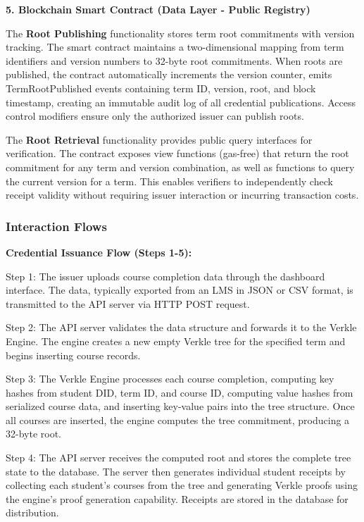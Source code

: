 \textbf{5. Blockchain Smart Contract (Data Layer - Public Registry)}

The \textbf{Root Publishing} functionality stores term root commitments with version tracking. The smart contract maintains a two-dimensional mapping from term identifiers and version numbers to 32-byte root commitments. When roots are published, the contract automatically increments the version counter, emits TermRootPublished events containing term ID, version, root, and block timestamp, creating an immutable audit log of all credential publications. Access control modifiers ensure only the authorized issuer can publish roots.

The \textbf{Root Retrieval} functionality provides public query interfaces for verification. The contract exposes view functions (gas-free) that return the root commitment for any term and version combination, as well as functions to query the current version for a term. This enables verifiers to independently check receipt validity without requiring issuer interaction or incurring transaction costs.

\subsubsection{Interaction Flows}

\textbf{Credential Issuance Flow (Steps 1-5):}

Step 1: The issuer uploads course completion data through the dashboard interface. The data, typically exported from an LMS in JSON or CSV format, is transmitted to the API server via HTTP POST request.

Step 2: The API server validates the data structure and forwards it to the Verkle Engine. The engine creates a new empty Verkle tree for the specified term and begins inserting course records.

Step 3: The Verkle Engine processes each course completion, computing key hashes from student DID, term ID, and course ID, computing value hashes from serialized course data, and inserting key-value pairs into the tree structure. Once all courses are inserted, the engine computes the tree commitment, producing a 32-byte root.

Step 4: The API server receives the computed root and stores the complete tree state to the database. The server then generates individual student receipts by collecting each student's courses from the tree and generating Verkle proofs using the engine's proof generation capability. Receipts are stored in the database for distribution.

